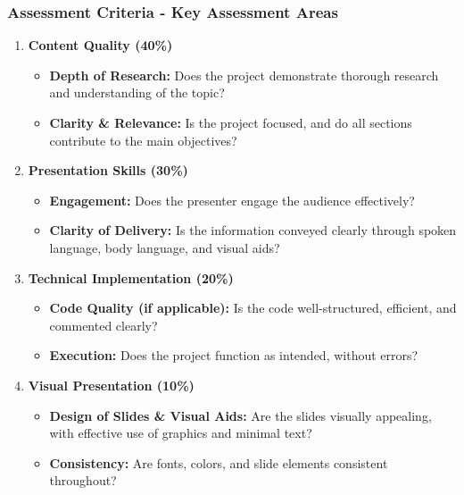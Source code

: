 \documentclass[aspectratio=169]{beamer}
\begin{document}
\begin{frame}
  \frametitle{Assessment Criteria - Key Assessment Areas}
  \begin{enumerate}
    \item \textbf{Content Quality (40\%)}
      \begin{itemize}
        \item \textbf{Depth of Research:} Does the project demonstrate thorough research and understanding of the topic? 
        \item \textbf{Clarity \& Relevance:} Is the project focused, and do all sections contribute to the main objectives?
      \end{itemize}
      
    \item \textbf{Presentation Skills (30\%)}
      \begin{itemize}
        \item \textbf{Engagement:} Does the presenter engage the audience effectively?
        \item \textbf{Clarity of Delivery:} Is the information conveyed clearly through spoken language, body language, and visual aids?
      \end{itemize}
      
    \item \textbf{Technical Implementation (20\%)}
      \begin{itemize}
        \item \textbf{Code Quality (if applicable):} Is the code well-structured, efficient, and commented clearly?
        \item \textbf{Execution:} Does the project function as intended, without errors?
      \end{itemize}

    \item \textbf{Visual Presentation (10\%)}
      \begin{itemize}
        \item \textbf{Design of Slides \& Visual Aids:} Are the slides visually appealing, with effective use of graphics and minimal text?
        \item \textbf{Consistency:} Are fonts, colors, and slide elements consistent throughout?
      \end{itemize}
  \end{enumerate}
\end{frame}
\end{document}
